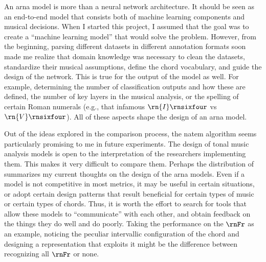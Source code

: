 
An \gls{arna} model is more than a neural network
architecture. It should be seen as an end-to-end model that
consists both of machine learning components and musical
decisions. When I started this project, I assumed that the
goal was to create a ``machine learning model'' that would
solve the problem. However, from the beginning, parsing
different datasets in different annotation formats soon made
me realize that domain knowledge was necessary to clean the
datasets, standardize their musical assumptions, define the
chord vocabulary, and guide the design of the network. This
is true for the output of the model as well. For example,
determining the number of classification outputs and how
these are defined, the number of key layers in the musical
analysis, or the spelling of certain Roman numerals (e.g.,
that infamous $\rn{I}\rnsixfour$ vs $\rn{V}\rnsixfour$). All
of these aspects shape the design of an \gls{arna} model.

Out of the ideas explored in the comparison process, the
\gls{natem} algorithm seems particularly promising to me in
future experiments. The design of tonal music analysis
models is open to the interpretation of the researchers
implementing them. This makes it very difficult to compare
them. Perhaps the distribution of 
summarizes my current thoughts on the design of the
\gls{arna} models. Even if a model is not competitive in
most metrics, it may be useful in certain situations, or
adopt certain design patterns that result beneficial for
certain types of music or certain types of chords. Thus, it
is worth the effort to search for tools that allow these
models to ``communicate'' with each other, and obtain
feedback on the things they do well and do poorly. Taking
the performance on the $\rnFr$ as an example, noticing the
peculiar intervallic configuration of the chord and
designing a representation that exploits it might be the
difference between recognizing all $\rnFr$ or none. 



